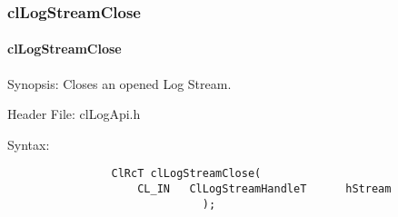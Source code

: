 \begin{flushleft}
\subsubsection{clLogStreamClose}
\hypertarget{pagelog108}{}\paragraph{cl\-Log\-Stream\-Close}\label{pagelog108}
\begin{Desc}
\item[Synopsis:]Closes an opened Log Stream. \end{Desc}
\begin{Desc}
\item[Header File:] clLogApi.h \end{Desc}
\begin{Desc}
\item[Syntax:]
\footnotesize\begin{verbatim}        	
				ClRcT clLogStreamClose(
					CL_IN	ClLogStreamHandleT		hStream
						      );


\end{verbatim}
\end{Desc}
\end{flushleft}
